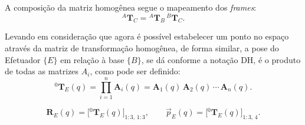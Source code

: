 A composição da matriz homogênea segue o mapeamento dos \emph{frames}:
\begin{equation}
\label{eq:comp_T}
{}^{A}\mathbf{T}_{C} = {}^{A}\mathbf{T}_{B}\,{}^{B}\mathbf{T}_{C}.
\end{equation}

Levando em consideração que agora é possível estabelecer um ponto no espaço através da matriz de transformação homogênea, de forma similar, a pose do Efetuador $\{E\}$ em relação à base $\{B\}$, se dá conforme a notação DH, é o produto de todas as matrizes $A_i$, como pode ser definido:
\begin{equation}
    \label{eq:produtorio_generico}
{}^{0}\mathbf{T}_E(q)= \prod_{i=1}^{n} \mathbf{A}_i(q)
= \mathbf{A}_1(q)\,\mathbf{A}_2(q)\,\cdots\,\mathbf{A}_n(q).
\end{equation}

\begin{equation}
\label{eq:extract_R_p}
\mathbf{R}_{E}(q)=\big[{}^{0}\mathbf{T}_{E}(q)\big]_{1:3,\,1:3},
\qquad
\vec{p}_{E}(q)=\big[{}^{0}\mathbf{T}_{E}(q)\big]_{1:3,\,4}.
\end{equation}





